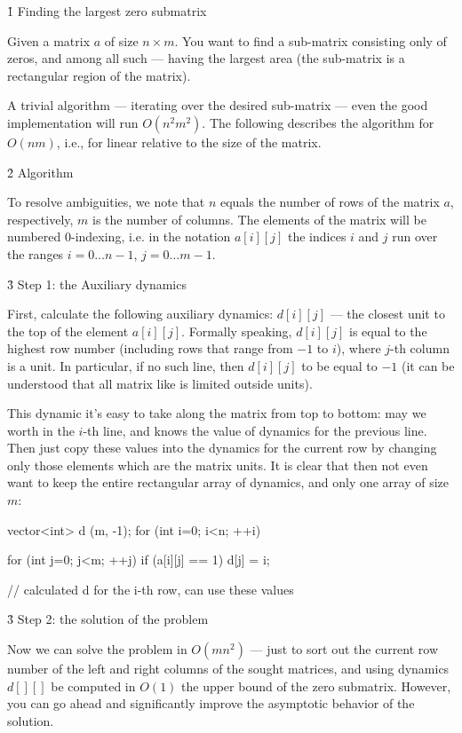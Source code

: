 \h1{ Finding the largest zero submatrix }

Given a matrix $a$ of size $n \times m$. You want to find a sub-matrix consisting only of zeros, and among all such --- having the largest area (the sub-matrix is a rectangular region of the matrix).

A trivial algorithm --- iterating over the desired sub-matrix --- even the good implementation will run $O (n^2 m^2)$. The following describes the algorithm for $O (n m)$, i.e., for linear relative to the size of the matrix.


\h2{ Algorithm }

To resolve ambiguities, we note that $n$ equals the number of rows of the matrix $a$, respectively, $m$ is the number of columns. The elements of the matrix will be numbered $0$-indexing, i.e. in the notation $a[i][j]$ the indices $i$ and $j$ run over the ranges $i = 0 \ldots n-1$, $j = 0 \ldots m-1$.


\h3{ Step 1: the Auxiliary dynamics }

First, calculate the following auxiliary dynamics: $d[i][j]$ --- the closest unit to the top of the element $a[i][j]$. Formally speaking, $d[i][j]$ is equal to the highest row number (including rows that range from $-1$ to $i$), where $j$-th column is a unit. In particular, if no such line, then $d[i][j]$ to be equal to $-1$ (it can be understood that all matrix like is limited outside units).

This dynamic it's easy to take along the matrix from top to bottom: may we worth in the $i$-th line, and knows the value of dynamics for the previous line. Then just copy these values into the dynamics for the current row by changing only those elements which are the matrix units. It is clear that then not even want to keep the entire rectangular array of dynamics, and only one array of size $m$:

\code
vector<int> d (m, -1);
for (int i=0; i<n; ++i) {
for (int j=0; j<m; ++j)
if (a[i][j] == 1)
d[j] = i;

// calculated d for the i-th row, can use these values
}
\endcode


\h3{ Step 2: the solution of the problem }

Now we can solve the problem in $O (m n^2)$ --- just to sort out the current row number of the left and right columns of the sought matrices, and using dynamics $d[][]$ be computed in $O (1)$ the upper bound of the zero submatrix. However, you can go ahead and significantly improve the asymptotic behavior of the solution.

